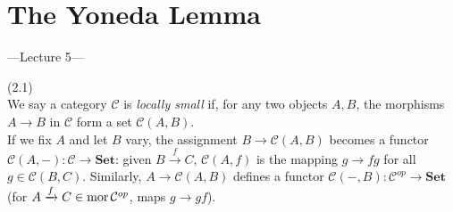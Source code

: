 \documentclass[a4paper]{article}
\begin{document}
\newpage

\section{The Yoneda Lemma}

---Lecture 5---
\begin{defi} (2.1)\\
    We say a category $\mathcal{C}$ is \emph{locally small} if, for any two objects $A,B$, the morphisms $A\to B$ in $\mathcal{C}$ form a set $\mathcal{C}(A,B)$.\\
    If we fix $A$ and let $B$ vary, the assignment $B \to \mathcal{C}(A,B)$ becomes a functor $\mathcal{C}(A,-):\mathcal{C} \to \mathbf{Set}$: given $B \xrightarrow{f} C$, $\mathcal{C}(A,f)$ is the mapping $g \to fg$ for all $g \in \mathcal{C}(B,C)$. Similarly, $A \to \mathcal{C}(A,B)$ defines a functor $\mathcal{C}(-,B):\mathcal{C}^{op} \to \mathbf{Set}$ (for $A \xrightarrow{f} C \in \operatorname{mor} \mathcal{C}^{op}$, maps $g \to gf$).
\end{defi}
\end{document}
